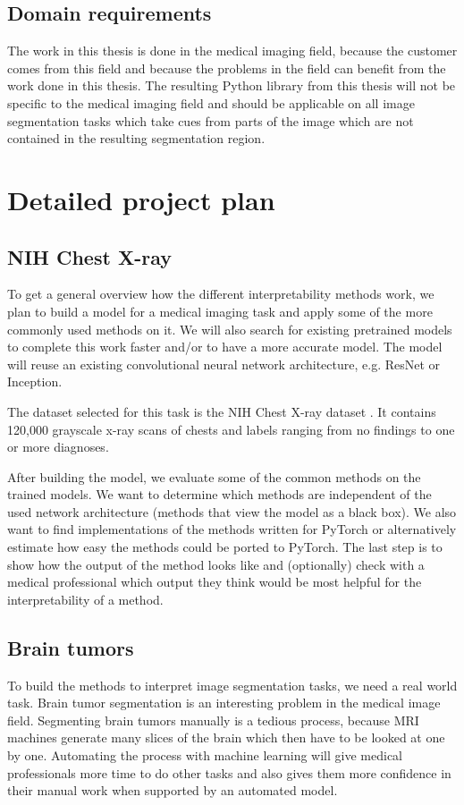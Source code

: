 \section{Domain requirements}
The work in this thesis is done in the medical imaging field, because the customer comes from this field and because the problems in the field can benefit from the
work done in this thesis. The resulting Python library from this thesis will not be specific to the medical imaging field and should be applicable on all image segmentation tasks which take cues from parts of the image which are not contained in the resulting segmentation region.

\chapter{Detailed project plan}
\section{NIH Chest X-ray}
To get a general overview how the different interpretability methods work, we plan to build a model for a medical imaging task and apply some of the more commonly used methods on it. We will also search for existing pretrained models to complete this work faster and/or to have a more accurate model. The model will reuse an existing convolutional neural network architecture, e.g. ResNet or Inception.

The dataset selected for this task is the NIH Chest X-ray dataset \cite{wang2017chestx}. It contains 120,000 grayscale x-ray scans of chests and labels ranging from no findings to one or more diagnoses.

After building the model, we evaluate some of the common methods on the trained models. We want to determine which methods are independent of the used network architecture (methods that view the model as a black box). We also want to find implementations of the methods written for PyTorch or alternatively estimate how easy the methods could be ported to PyTorch. The last step is to show how the output of the method looks like and (optionally) check with a medical professional which output they think would be most helpful for the interpretability of a method.

\section{Brain tumors}
To build the methods to interpret image segmentation tasks, we need a real world task. Brain tumor segmentation is an interesting problem in the medical image field. Segmenting brain tumors manually is a tedious process, because MRI machines generate many slices of the brain which then have to be looked at one by one. Automating the process with machine learning will give medical professionals more time to do other tasks and also gives them more confidence in their manual work when supported by an automated model.

